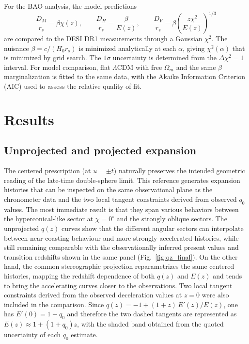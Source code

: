 \documentclass[preprint,12pt]{elsarticle}
\begin{document}
For the BAO analysis, the model predictions
\begin{equation}
\frac{D_M}{r_s} = \beta \chi(z),
\qquad
\frac{D_H}{r_s} = \frac{\beta}{E(z)},
\qquad
\frac{D_V}{r_s} = \beta \left(\frac{z\chi^2}{E(z)}\right)^{1/3}
\end{equation}
are compared to the DESI DR1 measurements through a Gaussian $\chi^2$. The nuisance $\beta = c/(H_0 r_s)$ is minimized analytically at each $\alpha$, giving $\chi^2(\alpha)$ that is minimized by grid search. The $1\sigma$ uncertainty is determined from the $\Delta \chi^2 = 1$ interval. For model comparison, flat $\Lambda$CDM with free $\Omega_m$ and the same $\beta$ marginalization is fitted to the same data, with the Akaike Information Criterion (AIC) used to assess the relative quality of fit.


\section{Results}

\subsection{Unprojected and projected expansion}

The centered prescription (at $u=\pm t$) naturally preserves the intended geometric reading of the late-time double-sphere limit. This reference generates expansion histories that can be inspected on the same observational plane as the chronometer data and the two local tangent constraints derived from observed $q_0$ values.  The most immediate result is that they span various behaviors between the hyperconical-like sector at $\chi=0^\circ$ and the strongly oblique sectors. The unprojected $q(z)$ curves show that the different angular sectors can interpolate between near-coasting behaviour and more strongly accelerated histories, while still remaining comparable with the observationally inferred present values and transition redshifts shown in the same panel (Fig.~\ref{fig:qz_final}). On the other hand, the common stereographic projection reparametrizes the same centered histories, mapping the redshift dependence of both $q(z)$ and $E(z)$ and tends to bring the accelerating curves closer to the observations. Two local tangent constraints derived from the observed deceleration values at $z=0$ were also included in the comparison. Since $q(z)=-1+(1+z)\,E'(z)/E(z)$, one has $E'(0)=1+q_0$ and therefore the two dashed tangents are represented as $E(z)\approx1+(1+q_0)z$, with the shaded band obtained from the quoted uncertainty of each $q_0$ estimate.
\end{document}
